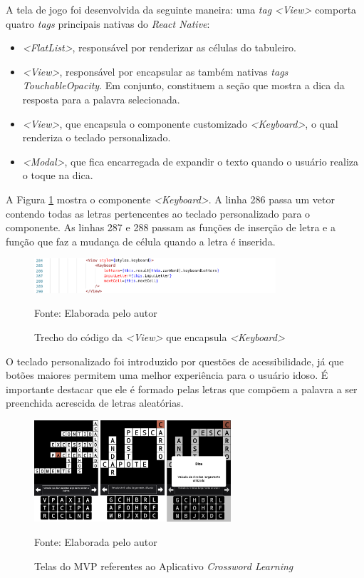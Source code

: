 A tela de jogo foi desenvolvida da seguinte maneira: uma \textit{tag} \textit{<View>} comporta quatro \textit{tags} principais nativas do \textit{React Native}:

\begin{itemize}
    \item \textit{<FlatList>}, responsável por renderizar as células do tabuleiro.
    \item \textit{<View>}, responsável por encapsular as também nativas \textit{tags} \textit{TouchableOpacity}. Em conjunto, constituem a seção que mostra a dica da resposta para a palavra selecionada. 
    \item \textit{<View>}, que encapsula o componente customizado \textit{<Keyboard>}, o qual renderiza o teclado personalizado.
    \item \textit{<Modal>}, que fica encarregada de expandir o texto quando o usuário realiza o toque na dica.
\end{itemize}

A Figura \ref{fig:keyboard} mostra o componente \textit{<Keyboard>}. A linha 286 passa um vetor contendo todas as letras pertencentes ao teclado personalizado para o componente. As linhas 287 e 288 passam as funções de inserção de letra e a função que faz a mudança de célula quando a letra é inserida. 

\begin{figure}[H]
\centering
    \caption{Trecho do código da \textit{<View>} que encapsula \textit{<Keyboard>}}
    \label{fig:keyboard}
    \includegraphics[width=0.8\textwidth]{Figuras/codeKeyboard.png}
    
    Fonte: Elaborada pelo autor
\end{figure}

O teclado personalizado foi introduzido por questões de acessibilidade, já que botões maiores permitem uma melhor experiência para o usuário idoso. É importante destacar que ele é formado pelas letras que compõem a palavra a ser preenchida acrescida de letras aleatórias.

\begin{figure}[H]
\centering
    \caption{Telas do MVP referentes ao Aplicativo \textit{Crossword Learning}}
    \label{fig:mvp}
    \includegraphics[width=0.65\textwidth]{Figuras/mvp.png}
    
    Fonte: Elaborada pelo autor
\end{figure}

